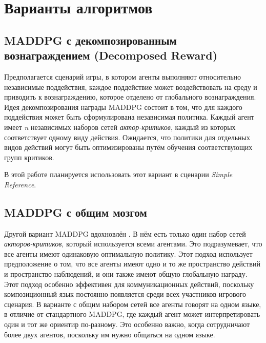 \section{Варианты алгоритмов}

\subsection{MADDPG с декомпозированным вознаграждением (Decomposed Reward)}

Предполагается сценарий игры, в котором агенты выполняют относительно независимые поддействия, каждое поддействие может воздействовать на среду и приводить к вознаграждению, которое отделено от глобального вознаграждения. Идея декомпозирования награды MADDPG состоит в том, что для каждого поддействия может быть сформулирована независимая политика. Каждый агент имеет \textit{n} независимых наборов сетей \textit{актор-критиков}, каждый из которых соответствует одному виду действия. Ожидается, что политики для отдельных видов действий могут быть оптимизированы путём обучения соответствующих групп критиков.

В этой работе планируется использовать этот вариант в сценарии \textit{Simple Reference}.

\subsection{MADDPG с общим мозгом}

Другой вариант MADDPG вдохновлён \cite{mordatch2017emergence}. В нём есть только один набор сетей \textit{акторов-критиков}, который используется всеми агентами. Это подразумевает, что все агенты имеют одинаковую оптимальную политику. Этот подход использует предположение о том, что все агенты имеют одно и то же пространство действий и пространство наблюдений, и они также имеют общую глобальную награду. Этот подход особенно эффективен для коммуникационных действий, поскольку композиционный язык постоянно появляется среди всех участников игрового сценария. В варианте с общим набором сетей все агенты говорят на одном языке, в отличие от стандартного MADDPG, где каждый агент может интерпретировать один и тот же ориентир по-разному. Это особенно важно, когда сотрудничают более двух агентов, поскольку им нужно общаться на одном языке.
